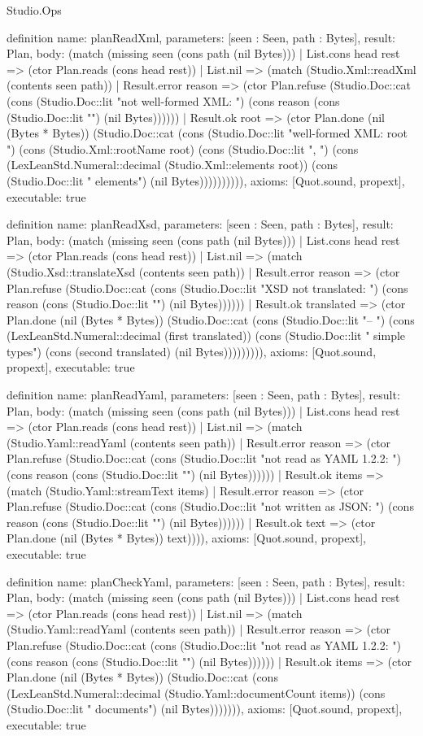 \begin{lexlean}{Studio.Ops}
\begin{semanticmodule}
definition{
  name: planReadXml,
  parameters: [seen : Seen, path : Bytes],
  result: Plan,
  body: (match (missing seen (cons path (nil Bytes)))
    | List.cons head rest => (ctor Plan.reads (cons head rest))
    | List.nil => (match (Studio.Xml::readXml (contents seen path))
      | Result.error reason => (ctor Plan.refuse (Studio.Doc::cat (cons (Studio.Doc::lit "not well-formed XML: ") (cons reason (cons (Studio.Doc::lit "\n") (nil Bytes))))))
      | Result.ok root => (ctor Plan.done (nil (Bytes * Bytes)) (Studio.Doc::cat (cons (Studio.Doc::lit "well-formed XML: root ") (cons (Studio.Xml::rootName root) (cons (Studio.Doc::lit ", ") (cons (LexLeanStd.Numeral::decimal (Studio.Xml::elements root)) (cons (Studio.Doc::lit " elements\n") (nil Bytes)))))))))),
  axioms: [Quot.sound, propext],
  executable: true
}

definition{
  name: planReadXsd,
  parameters: [seen : Seen, path : Bytes],
  result: Plan,
  body: (match (missing seen (cons path (nil Bytes)))
    | List.cons head rest => (ctor Plan.reads (cons head rest))
    | List.nil => (match (Studio.Xsd::translateXsd (contents seen path))
      | Result.error reason => (ctor Plan.refuse (Studio.Doc::cat (cons (Studio.Doc::lit "XSD not translated: ") (cons reason (cons (Studio.Doc::lit "\n") (nil Bytes))))))
      | Result.ok translated => (ctor Plan.done (nil (Bytes * Bytes)) (Studio.Doc::cat (cons (Studio.Doc::lit "-- ") (cons (LexLeanStd.Numeral::decimal (first translated)) (cons (Studio.Doc::lit " simple types\n") (cons (second translated) (nil Bytes))))))))),
  axioms: [Quot.sound, propext],
  executable: true
}

definition{
  name: planReadYaml,
  parameters: [seen : Seen, path : Bytes],
  result: Plan,
  body: (match (missing seen (cons path (nil Bytes)))
    | List.cons head rest => (ctor Plan.reads (cons head rest))
    | List.nil => (match (Studio.Yaml::readYaml (contents seen path))
      | Result.error reason => (ctor Plan.refuse (Studio.Doc::cat (cons (Studio.Doc::lit "not read as YAML 1.2.2: ") (cons reason (cons (Studio.Doc::lit "\n") (nil Bytes))))))
      | Result.ok items => (match (Studio.Yaml::streamText items)
        | Result.error reason => (ctor Plan.refuse (Studio.Doc::cat (cons (Studio.Doc::lit "not written as JSON: ") (cons reason (cons (Studio.Doc::lit "\n") (nil Bytes))))))
        | Result.ok text => (ctor Plan.done (nil (Bytes * Bytes)) text)))),
  axioms: [Quot.sound, propext],
  executable: true
}

definition{
  name: planCheckYaml,
  parameters: [seen : Seen, path : Bytes],
  result: Plan,
  body: (match (missing seen (cons path (nil Bytes)))
    | List.cons head rest => (ctor Plan.reads (cons head rest))
    | List.nil => (match (Studio.Yaml::readYaml (contents seen path))
      | Result.error reason => (ctor Plan.refuse (Studio.Doc::cat (cons (Studio.Doc::lit "not read as YAML 1.2.2: ") (cons reason (cons (Studio.Doc::lit "\n") (nil Bytes))))))
      | Result.ok items => (ctor Plan.done (nil (Bytes * Bytes)) (Studio.Doc::cat (cons (LexLeanStd.Numeral::decimal (Studio.Yaml::documentCount items)) (cons (Studio.Doc::lit " documents\n") (nil Bytes))))))),
  axioms: [Quot.sound, propext],
  executable: true
}


\end{semanticmodule}
\end{lexlean}
